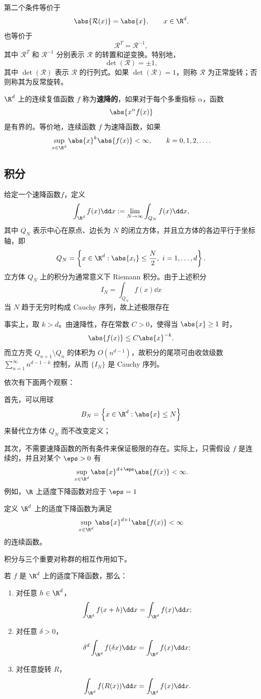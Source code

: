 第二个条件等价于
\[
\abs{\mathcal{R}(x)}=\abs{x},\qquad x\in\R^d,
\]
也等价于
\[
\mathcal{R}^{ T}=\mathcal{R}^{-1},
\]
其中 $\mathcal{R}^{ T}$ 和 $\mathcal{R}^{-1}$ 分别表示 $\mathcal{R}$ 的转置和逆变换。特别地，
\[
\det(\mathcal{R})=\pm1,
\]
其中 $\det(\mathcal{R})$ 表示 $\mathcal{R}$ 的行列式。如果 $\det(\mathcal{R})=1$，则称 $\mathcal{R}$ 为正常旋转；否则称其为反常旋转。

\begin{definition}
	$\R^d$ 上的连续复值函数 $f$ 称为\textbf{速降的}，如果对于每个多重指标 $\alpha$，函数
	\[
	\abs{x^\alpha f(x)}
	\]
	是有界的。等价地，连续函数 $f$ 为速降函数，如果
	\[
	\sup_{x\in\R^d}\abs{x}^k\abs{f(x)}<\infty,
	\qquad k=0,1,2,\ldots.
	\]
\end{definition}

\newpage
\subsection*{积分}
\begin{definition}
	给定一个速降函数$f$，定义
\[
\int_{\R^d}f(x)\dd x
:=\lim_{N\to\infty}\int_{Q_N}f(x)\dd x,
\]
其中 $Q_N$ 表示中心在原点、边长为 $N$ 的闭立方体，并且立方体的各边平行于坐标轴，即
\[
Q_N=\left\{x\in\R^d:\abs{x_i}\leq\frac{N}{2},\ i=1,\ldots,d\right\}.
\]
立方体 $Q_N$ 上的积分为通常意义下 Riemann 积分。由于上述积分
\[
I_N=\int_{Q_N}f(x)\dd x
\]
当 $N$ 趋于无穷时构成 Cauchy 序列，故上述极限存在
\end{definition}

事实上，取 $k>d$。由速降性，存在常数 $C>0$，使得当 $\abs{x}\geq1$ 时，
\[
\abs{f(x)}\leq C\abs{x}^{-k}.
\]
而立方壳 $Q_{n+1}\setminus Q_n$ 的体积为 $O(n^{d-1})$，故积分的尾项可由收敛级数
$\sum_{n=1}^{\infty}n^{d-1-k}$ 控制，从而 $\{I_N\}$ 是 Cauchy 序列。

依次有下面两个观察：

首先，可以用球
\[
B_N=\left\{x\in\R^d:\abs{x}\leq N\right\}
\]
来替代立方体 $Q_N$ 而不改变定义；

其次，不需要速降函数的所有条件来保证极限的存在。实际上，只需假设 $f$ 是连续的，并且对某个 $\eps>0$ 有
\[
\sup_{x\in\R^d}\abs{x}^{d+\eps}\abs{f(x)}<\infty.
\]
例如，$\R$ 上适度下降函数对应于 $\eps=1$
\begin{definition}
	定义 $\R^d$ 上的适度下降函数为满足
\[
\sup_{x\in\R^d}\abs{x}^{d+1}\abs{f(x)}<\infty
\]
的连续函数。
\end{definition}

积分与三个重要对称群的相互作用如下。

\begin{proposition}
	若 $f$ 是 $\R^d$ 上的适度下降函数，那么：
	\begin{enumerate}[label=(\roman*)]
		\item 对任意 $h\in\R^d$，
		\[
		\int_{\R^d}f(x+h)\dd x=\int_{\R^d}f(x)\dd x;
		\]

		\item 对任意 $\delta>0$，
		\[
		\delta^d\int_{\R^d}f(\delta x)\dd x
		=\int_{\R^d}f(x)\dd x;
		\]

		\item 对任意旋转 $R$，
		\[
		\int_{\R^d}f(R(x))\dd x
		=\int_{\R^d}f(x)\dd x.
		\]
	\end{enumerate}
\end{proposition}

